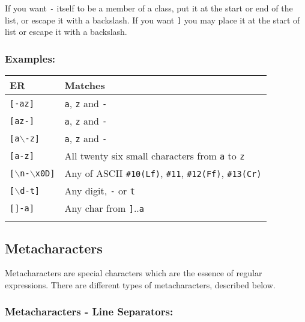 If you want \texttt{-} itself to be a member of a class, put it at the
start or end of the list, or escape it with a backslash. If you want
\texttt{]} you may place it at the start of list or escape it with a
backslash.


\subsubsection{Examples:}

\begin{footnotesize}
  \begin{tabularx}{\textwidth}{>{\hsize=0.3\hsize}X>{\hsize=0.7\hsize}X}\\
    \hline
    \textbf{ER} & \textbf{Matches} \\
    \hline
    \texttt{[-az]} & \texttt{a}, \texttt{z} and \texttt{-} \\
    \texttt{[az-]} & \texttt{a}, \texttt{z} and \texttt{-} \\
    \texttt{[a$\backslash$-z]} & \texttt{a}, \texttt{z} and \texttt{-} \\
    \texttt{[a-z]} & All twenty six small characters from \texttt{a} to \texttt{z} \\
    \texttt{[$\backslash$n-$\backslash$x0D]} & Any of ASCII \texttt{\#10(Lf)}, \texttt{\#11}, \texttt{\#12(Ff)}, \texttt{\#13(Cr)} \\
    \texttt{[$\backslash$d-t]} & Any digit, \texttt{-} or \texttt{t} \\
    \texttt{[]-a]} & Any char from \texttt{]}..\texttt{a} \\
    \hline
    \\
  \end{tabularx}
\end{footnotesize}


\subsection{Metacharacters}

Metacharacters are special characters which are the essence of regular
expressions. There are different types of metacharacters, described below.


\subsubsection{Metacharacters - Line Separators:}

